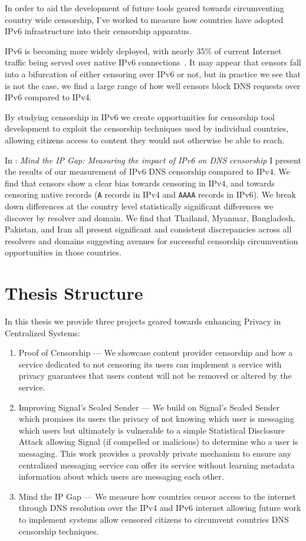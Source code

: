 In order to aid the development of future tools geared towards circumventing
country wide censorship, I've worked to measure how countries have adopted IPv6
infrastructure into their censorship apparatus.

IPv6 is becoming more widely deployed, with nearly 35\% of current Internet
traffic being served over native IPv6 connections~\cite{Google-IPv6}. It may
appear that censors fall into a bifurcation of either censoring over IPv6 or
not, but in practice we see that is not the case, we find a large range of how
well censors block DNS requests over IPv6 compared to IPv4.

By studying censorship in IPv6 we create opportunities for censorship tool
development to exploit the censorship techniques used by individual countries,
allowing citizens access to content they would not otherwise be able to reach.

In : \emph{Mind the IP Gap: Measuring the impact of IPv6 on DNS
censorship} I present the results of our measurement of IPv6 DNS censorship
compared to IPv4. We find that censors show a clear bias towards censoring in
IPv4, and towards censoring native records (\texttt{A} records in IPv4 and
\texttt{AAAA} records in IPv6). We break down differences at the country level
statistically significant differences we discover by resolver and domain. We
find that Thailand, Myanmar, Bangladesh, Pakistan, and Iran all present
significant and consistent discrepancies across all resolvers and domains
suggesting avenues for successful censorship circumvention opportunities in
those countries.

\section{Thesis Structure}
In this thesis we provide three projects geared towards enhancing Privacy in
Centralized Systems:

\begin{enumerate}
    \item Proof of Censorship --- We showcase content provider censorship and
    how a service dedicated to not censoring its users can implement a service
    with privacy guarantees that users content will not be removed or altered by
    the service.
    \item Improving Signal's Sealed Sender --- We build on Signal's Sealed
    Sender which promises its users the privacy of not knowing which user is
    messaging which users but ultimately is vulnerable to a simple Statistical
    Disclosure Attack allowing Signal (if compelled or malicious) to determine
    who a user is messaging. This work provides a provably private mechanism to
    ensure any centralized messaging service can offer its service without
    learning metadata information about which users are messaging each other.
    \item Mind the IP Gap --- We measure how countries censor access to the
    internet through DNS resolution over the IPv4 and IPv6 internet allowing
    future work to implement systems allow censored citizens to circumvent
    countries DNS censorship techniques.
\end{enumerate}